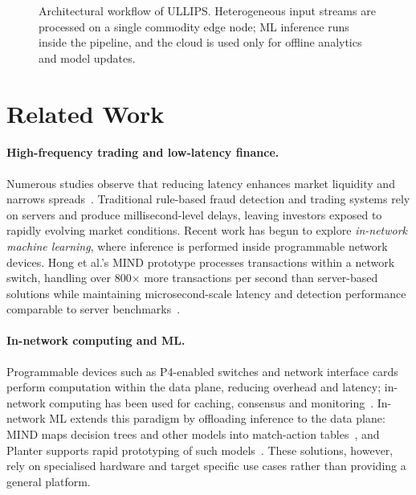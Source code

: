 \documentclass[10pt,a4paper,twocolumn]{article}
\begin{document}
\begin{figure}[t]
\caption{Architectural workflow of ULLIPS. Heterogeneous input streams are processed on a
single commodity edge node; ML inference runs inside the pipeline, and the cloud is used only
for offline analytics and model updates.}
\label{fig:workflow}
\end{figure}

\section{Related Work}\label{sec:related}
\paragraph{High-frequency trading and low-latency finance.}
Numerous studies observe that reducing latency enhances market liquidity and narrows
spreads~\cite{investopedia}. Traditional rule-based fraud detection and trading systems rely
on servers and produce millisecond-level delays, leaving investors exposed to rapidly
evolving market conditions. Recent work has begun to explore \emph{in-network machine
learning}, where inference is performed inside programmable network devices. Hong et al.'s
MIND prototype processes transactions within a network switch, handling over 800$\times$
more transactions per second than server-based solutions while maintaining
microsecond-scale latency and detection performance comparable to server
benchmarks~\cite{mind}.

\paragraph{In-network computing and ML.}
Programmable devices such as P4-enabled switches and network interface cards perform
computation within the data plane, reducing overhead and latency; in-network computing has
been used for caching, consensus and monitoring~\cite{survey}. In-network ML extends this
paradigm by offloading inference to the data plane: MIND maps decision trees and other
models into match-action tables~\cite{mind}, and Planter supports rapid prototyping of such
models~\cite{planter}. These solutions, however, rely on specialised hardware and target
specific use cases rather than providing a general platform.
\end{document}
